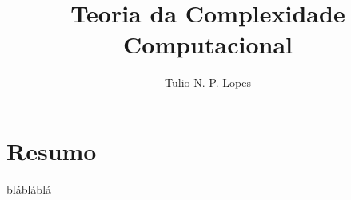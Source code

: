 \documentclass[12pt]{article}
\title{Teoria da Complexidade Computacional}
\author{Tulio N. P. Lopes}
\begin{document}
 

\maketitle

\section{Resumo}

blábláblá 
\end{document}
